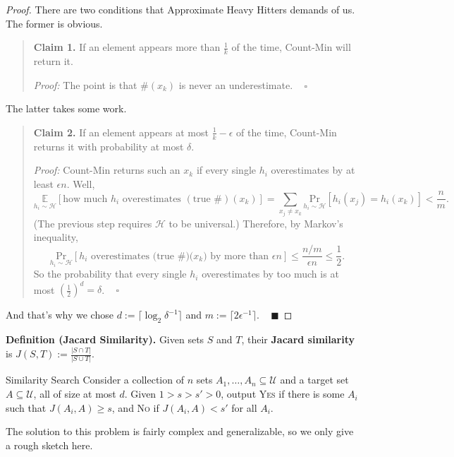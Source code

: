 \begin{proof}
    There are two conditions that Approximate Heavy Hitters demands of us.  The former is obvious.
    \begin{quote}
        \textbf{Claim 1.} If an element appears more than $\frac{1}{k}$ of the time, Count-Min will return it.

        \emph{Proof:} The point is that $\#(x_k)$ is never an underestimate. ~ $\square$
    \end{quote}
    The latter takes some work.
    \begin{quote}
        \textbf{Claim 2.} If an element appears at most $\frac{1}{k} - \epsilon$ of the time, Count-Min returns it with probability at most $\delta$.

        \emph{Proof:} Count-Min returns such an $x_k$ if every single $h_i$ overestimates by at least $\epsilon n$.  Well,
        \[ \underset{h_i \sim \mathcal{H}}{\mathbb{E}}[\text{how much } h_i \text{ overestimates } (\text{true \#})(x_k)] = \sum_{x_j \neq x_k} \underset{h_i \sim \mathcal{H}}{\mathrm{Pr}} \left [ h_i(x_j) = h_i(x_k) \right ] < \dfrac{n}{m}. \]
        (The previous step requires $\mathcal{H}$ to be universal.) Therefore, by Markov's inequality,
        \[ \underset{h_i \sim \mathcal{H}}{\mathrm{Pr}}[h_i \text{ overestimates (true \#)($x_k$) by more than } \epsilon n] \leq \dfrac{n / m}{\epsilon n} \leq \dfrac{1}{2}. \]
        So the probability that every single $h_i$ overestimates by too much is at most $\left(\frac{1}{2}\right)^{d} = \delta$. ~ $\square$
    \end{quote}
    And that's why we chose $d := \lceil \log_2 \delta^{-1} \rceil$ and $m := \lceil 2 \epsilon^{-1} \rceil$. ~ $\blacksquare$
\end{proof}

\textbf{Definition (Jacard Similarity).} Given sets $S$ and $T$, their \textbf{Jacard similarity} is $J(S, T) := \frac{|S \cap T|}{|S \cup T|}$.

\begin{problem}{Similarity Search}
    Consider a collection of $n$ sets $A_1, \dots, A_n \subseteq \mathcal{U}$ and a target set $A \subseteq \mathcal{U}$, all of size at most $d$.  Given $1 > s > s' > 0$, output \textsc{Yes} if there is some $A_i$ such that $J(A_i, A) \geq s$, and \textsc{No} if $J(A_i, A) < s'$ for all $A_i$.
\end{problem}

The solution to this problem is fairly complex and generalizable, so we only give a rough sketch here.

